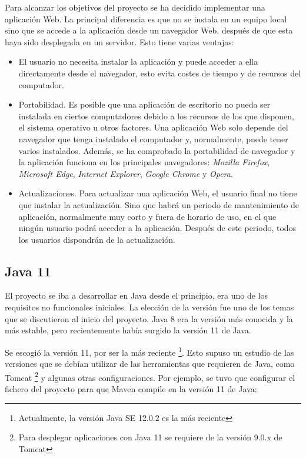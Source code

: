 Para alcanzar los objetivos del proyecto se ha decidido implementar una aplicación Web. La principal diferencia es que no se instala en un equipo local sino que se accede a la aplicación desde un navegador Web, después de que esta haya sido desplegada en un servidor. Esto tiene varias ventajas: 
\begin{itemize}
	\tightlist
	\item El usuario no necesita instalar la aplicación y puede acceder a ella directamente desde el navegador, esto evita costes de tiempo y de recursos del computador.
	\item  Portabilidad. Es posible que una aplicación de escritorio no pueda ser instalada en ciertos computadores debido a los recursos de los que disponen, el sistema operativo u otros factores. Una aplicación Web solo depende del navegador que tenga instalado el computador y, normalmente, puede tener varios instalados. Además, se ha comprobado la portabilidad de navegador y la aplicación funciona en los principales navegadores: \textit{Mozilla Firefox}, \textit{Microsoft Edge}, \textit{Internet Explorer}, \textit{Google Chrome} y \textit{Opera}.
	\item Actualizaciones. Para actualizar una aplicación Web, el usuario final no tiene que instalar la actualización. Sino que habrá un periodo de mantenimiento de aplicación, normalmente muy corto y fuera de horario de uso, en el que ningún usuario podrá acceder a la aplicación. Después de este periodo, todos los usuarios dispondrán de la actualización.
\end{itemize}

\subsection{Java 11}

El proyecto se iba a desarrollar en Java desde el principio, era uno de los requisitos no funcionales iniciales. La elección de la versión fue uno de los temas que se discutieron al inicio del proyecto. Java 8 era la versión más conocida y la más estable, pero recientemente había surgido la versión 11 de Java. 

Se escogió la versión 11, por ser la más reciente \footnote{Actualmente, la versión Java SE 12.0.2 es la más reciente}. Esto supuso un estudio de las versiones que se debían utilizar de las herramientas que requieren de Java, como Tomcat \footnote{Para desplegar aplicaciones con Java 11 se requiere de la versión 9.0.x de Tomcat} y algunas otras configuraciones. Por ejemplo, se tuvo que configurar el fichero  del proyecto para que Maven compile en la versión 11 de Java:

